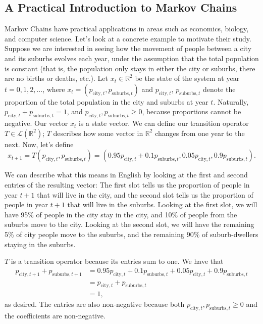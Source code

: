 \documentclass{article}
\renewcommand{\L}{\mathcal{L}}
\newcommand{\R}{\mathbb{R}}
\theoremstyle{definition}
\begin{document}
\subsection{A Practical Introduction to Markov Chains}
\label{sec: markov-chain-practical-intro}

Markov Chains have practical applications in areas such as economics, biology, and computer science. Let's look at a concrete example to motivate their study. Suppose we are interested in seeing how the movement of people between a city and its suburbs evolves each year, under the assumption that the total population is constant (that is, the population only stays in either the city or suburbs, there are no births or deaths, etc.). Let $x_t \in \R^2$ be the state of the system at year $t = 0, 1, 2, \dots$, where $x_t = (p_{\text{city}, t}, p_{\text{suburbs}, t})$ and $p_{\text{city}, t}$, $p_{\text{suburbs}, t}$ denote the proportion of the total population in the city and suburbs at year $t$. Naturally, $p_{\text{city}, t} + p_{\text{suburbs}, t} = 1$, and $p_{\text{city}, t}, p_{\text{suburbs}, t} \geq 0$, because proportions cannot be negative. Our vector $x_t$ is a state vector.  We can define our transition operator $T \in \L(\R^2)$; $T$ describes how some vector in $\R^2$ changes from one year to the next. Now, let's define $$x_{t + 1} = T(p_{\text{city}, t}, p_{\text{suburbs}, t}) = (0.95p_{\text{city}, t} + 0.1p_{\text{suburbs}, t}, 0.05p_{\text{city}, t}, 0.9p_{\text{suburbs}, t}).$$

We can describe what this means in English by looking at the first and second entries of the resulting vector: The first slot tells us the proportion of people in year $t + 1$ that will live in the city, and the second slot tells us the proportion of people in year $t + 1$ that will live in the suburbs. Looking at the first slot, we will have 95\% of people in the city stay in the city, and 10\% of people from the suburbs move to the city. Looking at the second slot, we will have the remaining 5\% of city people move to the suburbs, and the remaining 90\% of suburb-dwellers staying in the suburbs.

$T$ is a transition operator because its entries sum to one. We have that
\begin{align*}
    p_{\text{city}, t + 1} + p_{\text{suburbs}, t + 1} &= 0.95p_{\text{city}, t} + 0.1p_{\text{suburbs}, t} + 0.05p_{\text{city}, t} + 0.9p_{\text{suburbs}, t}\\
    &= p_{\text{city}, t} + p_{\text{suburbs}, t} \\
    &= 1,
\end{align*}
as desired. The entries are also non-negative because both $p_{\text{city}, t}, p_{\text{suburbs}, t} \geq 0$ and the coefficients are non-negative.
\end{document}
